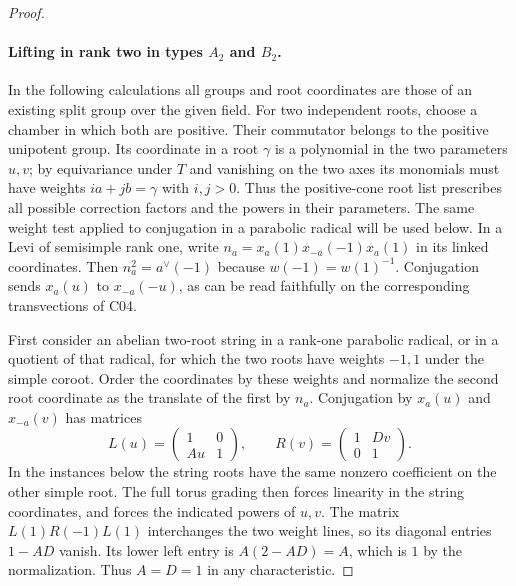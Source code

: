 \documentclass[11pt,a4paper,openany,oneside]{book}
\theoremstyle{resultstyle}
\theoremstyle{definition}
\numberwithin{equation}{chapter}
\begin{document}
\begin{proof}
\paragraph{Lifting in rank two in types \texorpdfstring{\(A_2\) and \(B_2\)}{A2 and B2}.}
In the following calculations all groups and root coordinates are
those of an existing split group over the given field. For two
independent roots, choose a chamber in which both are positive.
Their commutator belongs to the positive unipotent group. Its
coordinate in a root \(\gamma\) is a polynomial in the two
parameters \(u,v\); by equivariance under \(T\) and vanishing on
the two axes its monomials must have weights \(ia+jb=\gamma\)
with \(i,j>0\). Thus the positive-cone root list prescribes all
possible correction factors and the powers in their parameters.
The same weight test applied to conjugation in a parabolic
radical will be used below. In a Levi of semisimple rank one,
write \(n_a=x_a(1)x_{-a}(-1)x_a(1)\) in its linked coordinates.
Then \(n_a^2=a^\vee(-1)\) because \(w(-1)=w(1)^{-1}\).
Conjugation sends \(x_a(u)\) to \(x_{-a}(-u)\), as can be
read faithfully on the corresponding transvections of C04.

First consider an abelian two-root string in a rank-one
parabolic radical, or in a quotient of that radical, for which
the two roots have weights \(-1,1\) under the simple coroot.
Order the coordinates by these weights and normalize the second
root coordinate as the translate of the first by \(n_a\).
Conjugation by \(x_a(u)\) and \(x_{-a}(v)\) has matrices
\[
 L(u)=\begin{pmatrix}1&0\\ Au&1\end{pmatrix},\qquad
 R(v)=\begin{pmatrix}1&Dv\\0&1\end{pmatrix}.
\]
In the instances below the string roots have the same
nonzero coefficient on the other simple root. The full torus grading then forces
linearity in the string coordinates, and forces the indicated
powers of \(u,v\). The matrix \(L(1)R(-1)L(1)\) interchanges
the two weight lines, so its diagonal entries \(1-AD\) vanish.
Its lower left entry is \(A(2-AD)=A\), which is \(1\) by
the normalization. Thus \(A=D=1\) in any characteristic.


\end{proof}
\end{document}
